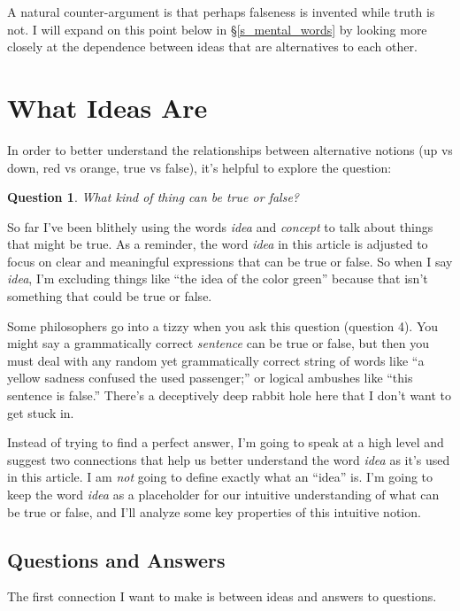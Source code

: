 \documentclass[11pt, oneside]{article}   	%
\newtheorem{question}{Question}
\begin{document}
A natural counter-argument is that perhaps falseness is invented while truth is
not.
I will expand on this point below in \S\ref{s_mental_words}
by looking more closely at the dependence between ideas that are alternatives to
each other.

\section{What Ideas Are}

In order to better understand the relationships between alternative
notions (up vs down, red vs orange, true vs false), it's
helpful to explore the question:
\begin{question}
    What kind of thing can be true or false?
\end{question}

So far I've been blithely using the words {\em idea} and {\em concept} to talk
about things that might be true.
As a reminder, the word {\em idea} in this article is adjusted to focus on
clear and meaningful expressions that can be true or false.
So when I say {\em idea}, I'm excluding
things like ``the idea of the color green'' because that isn't something that
could be true or false.

Some philosophers go into a tizzy when you ask this question (question 4).
You might say a grammatically correct {\em sentence} can be true or false,
but then you must deal with any random yet grammatically correct string
of words
like ``a yellow sadness confused the used
passenger;'' or logical ambushes like ``this sentence is false.''
There's a deceptively deep rabbit hole here that I don't want to get stuck in.

Instead of trying to find a perfect answer, I'm going to speak at a high level
and suggest two connections that help us better understand the word {\em idea}
as it's used in this article.
I am {\em not} going to define exactly what an ``idea'' is.
I'm going to keep the word {\em idea} as a placeholder for our
intuitive understanding of what can be true or false, and I'll analyze some key
properties of this intuitive notion.

\subsection{Questions and Answers}

The first connection I want to make is between ideas and answers to questions.
\end{document}
